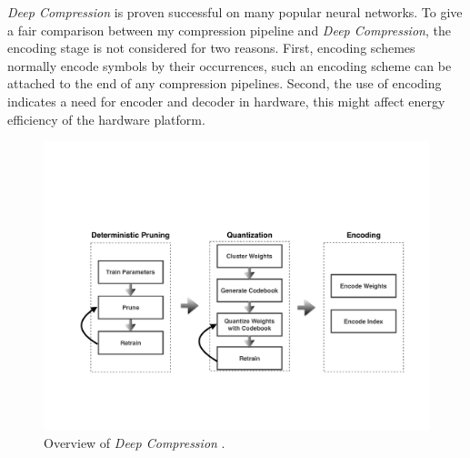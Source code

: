 \documentclass[a4paper,12pt]{report}
\begin{document}
\textit{Deep Compression} is proven successful on many popular neural networks.
To give a fair comparison between my compression pipeline and \textit{Deep Compression},
the encoding stage is not considered for two reasons.
First, encoding schemes normally encode symbols by their occurrences, such an encoding
scheme can be attached to the end of any compression pipelines.
Second, the use of encoding indicates a need for encoder and decoder in hardware,
this might affect energy efficiency of the hardware platform.
\begin{figure}[!h]

  \includegraphics[width=\textwidth]{fig_dc.pdf}
  \caption{Overview of \textit{Deep Compression} \cite{Han15}.}
  \label{fig:deep_compression_flow}
\end{figure}
\end{document}

